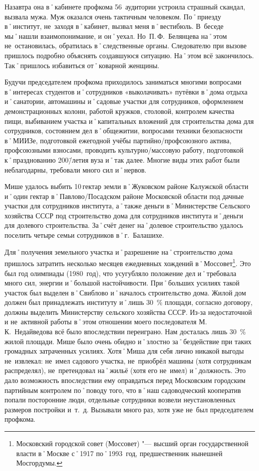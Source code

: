 Назавтра она в˚кабинете профкома 56~аудитории устроила страшный скандал, вызвала мужа. Муж оказался очень тактичным человеком. По˚приезду в˚институт, не~заходя в˚кабинет, вызвал меня в˚вестибюль. В~беседе мы˚нашли взаимопонимание, и он˚уехал. Но~П.\,Ф.~Белянцева на˚этом не~остановилась, обратилась в˚следственные органы. Следователю при вызове пришлось подробно объяснять создавшуюся ситуацию. На˚этом всё закончилось. Так˚пришлось избавиться от˚коварной женщины. 

Будучи председателем профкома приходилось заниматься многими вопросами в˚интересах студентов и˚сотрудников «выколачивать» путёвки в˚дома отдыха и˚санатории, автомашины и˚садовые участки для сотрудников, оформлением демонстрационных колонн, работой кружков, столовой, контролем качества пищи, выбиванием участка и˚капитальных вложений для строительства дома для сотрудников, состоянием дел в˚общежитии, вопросами техники безопасности в˚МИИЗе, подготовкой ежегодной учёбы партийно\-/профсоюзного актива, профсоюзными взносами, проводить культурно\-/массовую работу, подготовкой к˚празднованию 200\=/летия вуза и˚так далее. Многие виды этих работ были неблагодарны, требовали много сил и˚нервов. 

Мише удалось выбить 10\,гектар земли в˚Жуковском районе Калужской области и˚один гектар в˚Павлово\-/Посадском районе Московской области под дачные участки для сотрудников института, а˚также деньги в˚Министерстве Сельского хозяйства СССР под строительство дома для сотрудников института и˚деньги для долевого строительства. За˚счёт денег на˚долевое строительство удалось поселить четыре семьи сотрудников в˚г.~Балашихе.

Для˚получения земельного участка и˚разрешение на˚строительство дома пришлось затратить несколько месяцев ежедневных хождений в˚Моссовет\footnote{Московский городской совет (Моссовет) "--- высший орган государственной власти в˚Москве с˚1917 по˚1993~год, предшественник нынешней Мосгордумы.}. Это был год олимпиады (1980~год), что усугубляло положение дел и˚требовала много сил, энергии и˚большой настойчивости. При˚больших усилиях такой участок был выделен в˚Свиблово и˚началось строительство дома. Жилой дом должен был принадлежать институту и˚лишь 30~\% площади, согласно договору, должны выделить Министерству сельского хозяйства СССР. Из-за недостаточной и не~активной работы в˚этом отношении моего последователя М.\,К.~Недайведова всё было впоследствии переиграно. Нам досталась лишь 30~\% жилой площади. Мише было очень обидно и˚злостно за˚бездействие при таких громадных затраченных усилиях. Хотя˚Миша для себя лично никакой выгоды не~извлекал: не~имел садового участка, не~приобрёл машины (хотя сотрудникам распределял), не~претендовал на˚жильё (хотя его не~имел) и˚должность. Это дало возможность впоследствии ему оправдаться перед Московским городским партийным контролем по˚поводу того, что в˚наш садоводческий кооператив попали посторонние люди, отдельные сотрудники возвели неустановленных размеров постройки и~т.~д. Вызывали много раз, хотя уже не~был председателем профкома.

